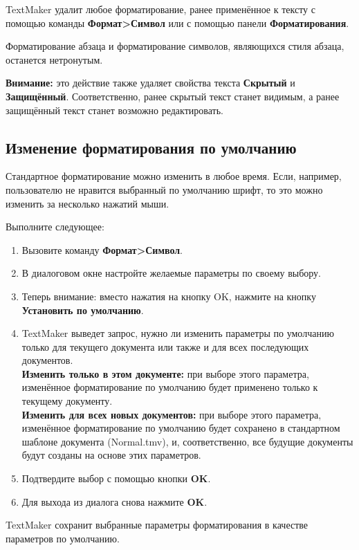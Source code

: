 \documentclass[a4paper,10pt]{article}
\begin{document}
TextMaker удалит любое форматирование, ранее применённое к тексту с помощью команды \textbf{Формат>Символ} или с помощью панели \textbf{Форматирования}.

Форматирование абзаца и форматирование символов, являющихся стиля абзаца, останется нетронутым.

\begin{mdframed}[backgroundcolor=blue!10]
\textbf{Внимание:} это действие также удаляет свойства текста \textbf{Скрытый} и \textbf{Защищённый}. Соответственно, ранее скрытый текст станет видимым, а ранее защищённый текст станет возможно редактировать.
\end{mdframed}

\subsection{Изменение форматирования по умолчанию}
Стандартное форматирование можно изменить в любое время. Если, например, пользователю не нравится выбранный по умолчанию шрифт, то это можно изменить за несколько нажатий мыши.

Выполните следующее:
\begin{enumerate}
 \item Вызовите команду \textbf{Формат>Символ}.
 \item В диалоговом окне настройте желаемые параметры по своему выбору.
 \item Теперь внимание: вместо нажатия на кнопку OK, нажмите на кнопку \textbf{Установить по умолчанию}.
 \item TextMaker выведет запрос, нужно ли изменить параметры по умолчанию только для текущего документа или также и для всех последующих документов.\\
\textbf{Изменить только в этом документе:} при выборе этого параметра, изменённое форматирование по умолчанию будет применено только к текущему документу.\\
\textbf{Изменить для всех новых документов:} при выборе этого параметра, изменённое форматирование по умолчанию будет сохранено в стандартном шаблоне документа (Normal.tmv), и, соответственно, все будущие документы будут созданы на основе этих параметров.
\item Подтвердите выбор с помощью кнопки \textbf{OK}.
\item Для выхода из диалога снова нажмите \textbf{OK}.
\end{enumerate}

TextMaker сохранит выбранные параметры форматирования в качестве параметров по умолчанию.
\end{document}
